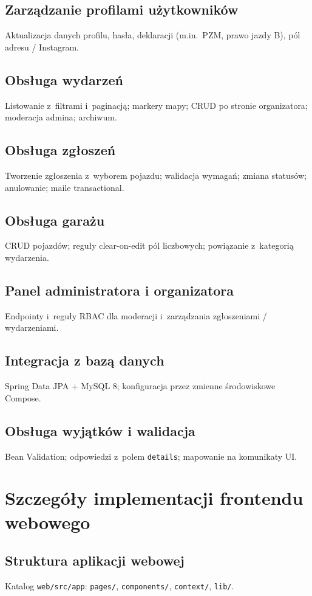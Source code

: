 \documentclass{sprz}
\begin{document}
\section{Zarządzanie profilami użytkowników}  
Aktualizacja danych profilu, hasła, deklaracji (m.in.\ PZM, prawo jazdy B), pól adresu / Instagram.  
\section{Obsługa wydarzeń}  
Listowanie z~filtrami i~paginacją; markery mapy; CRUD po stronie organizatora; moderacja admina; archiwum.  
\section{Obsługa zgłoszeń}  
Tworzenie zgłoszenia z~wyborem pojazdu; walidacja wymagań; zmiana statusów; anulowanie; maile transactional.  
\section{Obsługa garażu}  
CRUD pojazdów; reguły clear-on-edit pól liczbowych; powiązanie z~kategorią wydarzenia.  
\section{Panel administratora i organizatora}  
Endpointy i~reguły RBAC dla moderacji i~zarządzania zgłoszeniami / wydarzeniami.  
\section{Integracja z bazą danych}  
Spring Data JPA + MySQL 8; konfiguracja przez zmienne środowiskowe Compose.  
\section{Obsługa wyjątków i walidacja}  
Bean Validation; odpowiedzi z~polem \texttt{details}; mapowanie na komunikaty UI.  
  
\chapter{Szczegóły implementacji frontendu webowego}  
\label{ch:frontend}  
\section{Struktura aplikacji webowej}  
Katalog \texttt{web/src/app}: \texttt{pages/}, \texttt{components/}, \texttt{context/}, \texttt{lib/}.  
\end{document}
